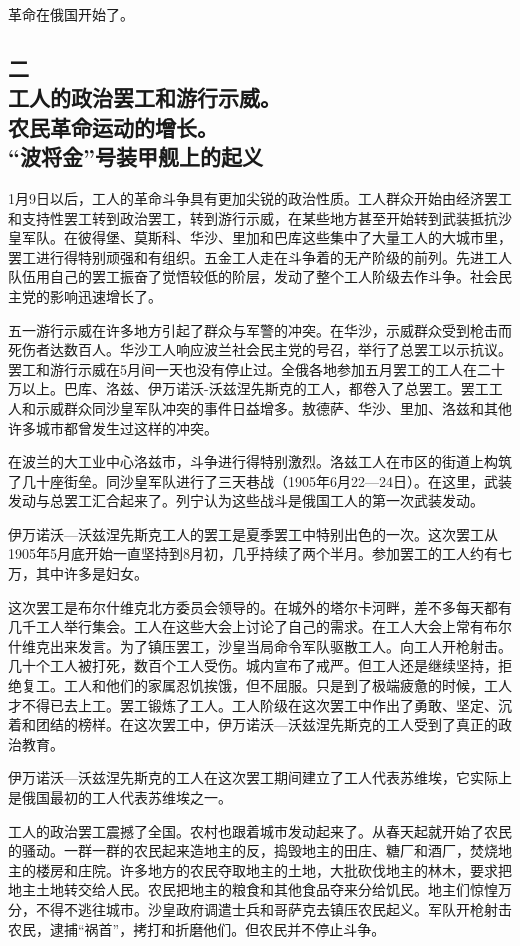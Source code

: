 革命在俄国开始了。


\subsection[二\q 工人的政治罢工和游行示威。农民革命运动的增长。“波将金”号装甲舰上的起义]{二\\ 工人的政治罢工和游行示威。\\ 农民革命运动的增长。\\ “波将金”号装甲舰上的起义}

1月9日以后，工人的革命斗争具有更加尖锐的政治性质。工人群众开始由经济罢工和支持性罢工转到政治罢工，转到游行示威，在某些地方甚至开始转到武装抵抗沙皇军队。在彼得堡、莫斯科、华沙、里加和巴库这些集中了大量工人的大城市里，罢工进行得特别顽强和有组织。五金工人走在斗争着的无产阶级的前列。先进工人队伍用自己的罢工振奋了觉悟较低的阶层，发动了整个工人阶级去作斗争。社会民主党的影响迅速增长了。

五一游行示威在许多地方引起了群众与军警的冲突。在华沙，示威群众受到枪击而死伤者达数百人。华沙工人响应波兰社会民主党的号召，举行了总罢工以示抗议。罢工和游行示威在5月间一天也没有停止过。全俄各地参加五月罢工的工人在二十万以上。巴库、洛兹、伊万诺沃-沃兹涅先斯克的工人，都卷入了总罢工。罢工工人和示威群众同沙皇军队冲突的事件日益增多。敖德萨、华沙、里加、洛兹和其他许多城市都曾发生过这样的冲突。

在波兰的大工业中心洛兹市，斗争进行得特别激烈。洛兹工人在市区的街道上构筑了几十座街垒。同沙皇军队进行了三天巷战（1905年6月22—24日）。在这里，武装发动与总罢工汇合起来了。列宁认为这些战斗是俄国工人的第一次武装发动。

伊万诺沃—沃兹涅先斯克工人的罢工是夏季罢工中特别出色的一次。这次罢工从1905年5月底开始一直坚持到8月初，几乎持续了两个半月。参加罢工的工人约有七万，其中许多是妇女。

这次罢工是布尔什维克北方委员会领导的。在城外的塔尔卡河畔，差不多每天都有几千工人举行集会。工人在这些大会上讨论了自己的需求。在工人大会上常有布尔什维克出来发言。为了镇压罢工，沙皇当局命令军队驱散工人。向工人开枪射击。几十个工人被打死，数百个工人受伤。城内宣布了戒严。但工人还是继续坚持，拒绝复工。工人和他们的家属忍饥挨饿，但不屈服。只是到了极端疲惫的时候，工人才不得已去上工。罢工锻炼了工人。工人阶级在这次罢工中作出了勇敢、坚定、沉着和团结的榜样。在这次罢工中，伊万诺沃—沃兹涅先斯克的工人受到了真正的政治教育。

伊万诺沃—沃兹涅先斯克的工人在这次罢工期间建立了工人代表苏维埃，它实际上是俄国最初的工人代表苏维埃之一。

工人的政治罢工震撼了全国。农村也跟着城市发动起来了。从春天起就开始了农民的骚动。一群一群的农民起来造地主的反，捣毁地主的田庄、糖厂和酒厂，焚烧地主的楼房和庄院。许多地方的农民夺取地主的土地，大批砍伐地主的林木，要求把地主土地转交给人民。农民把地主的粮食和其他食品夺来分给饥民。地主们惊惶万分，不得不逃往城市。沙皇政府调遣士兵和哥萨克去镇压农民起义。军队开枪射击农民，逮捕“祸首”，拷打和折磨他们。但农民并不停止斗争。

